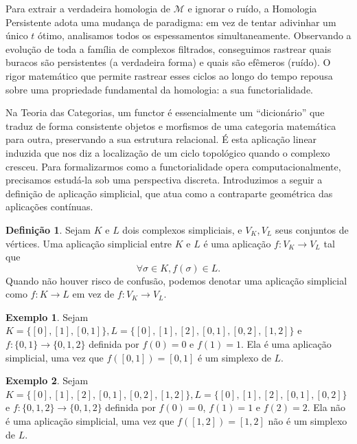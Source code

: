 \documentclass[12pt, a4paper]{article}
\theoremstyle{plain}
\theoremstyle{definition}
\newtheorem{definition}{Definição}[section]
\newtheorem{example}{Exemplo}[section]
\theoremstyle{remark}
\newcommand{\ident}{\hspace{2em}}
\begin{document}
\ident Para extrair a verdadeira homologia de $\mathcal{M}$ e ignorar o ruído, a Homologia Persistente adota uma mudança de paradigma: em vez de tentar adivinhar um único $t$ ótimo, analisamos todos os espessamentos simultaneamente. Observando a evolução de toda a família de complexos filtrados, conseguimos rastrear quais buracos são persistentes (a verdadeira forma) e quais são efêmeros (ruído). O rigor matemático que permite rastrear esses ciclos ao longo do tempo repousa sobre uma propriedade fundamental da homologia: a sua functorialidade.

\ident Na Teoria das Categorias, um functor é essencialmente um ``dicionário'' que traduz de forma consistente objetos e morfismos de uma categoria matemática para outra, preservando a sua estrutura relacional. É esta aplicação linear induzida que nos diz a localização de um ciclo topológico quando o complexo cresceu. Para formalizarmos como a functorialidade opera computacionalmente, precisamos estudá-la sob uma perspectiva discreta. Introduzimos a seguir a definição de aplicação simplicial, que atua como a contraparte geométrica das aplicações contínuas.

\begin{definition}
    Sejam $K$ e $L$ dois complexos simpliciais, e $V_K, V_L$ seus conjuntos de vértices. Uma aplicação simplicial entre $K$ e $L$ é uma aplicação $f: V_K \to V_L$ tal que
    \[
    \forall \sigma \in K, f(\sigma) \in L.
    \] 
    Quando não houver risco de confusão, podemos denotar uma aplicação simplicial como $f: K \to L$ em vez de $f: V_K \to V_L$.
\end{definition}

\begin{example}
    Sejam $K = \{[0], [1], [0, 1]\}, L = \{[0], [1], [2], [0, 1], [0, 2], [1, 2]\}$ e $f : \{0, 1\} \to\{0, 1, 2\}$ definida por $f(0) = 0$ e $f(1) = 1$. Ela é uma aplicação simplicial, uma vez que $f([0, 1]) = [0, 1]$ é um
    simplexo de $L$.
\end{example}
    
\begin{example}
    Sejam $K = \{[0], [1], [2], [0, 1], [0, 2], [1, 2]\}, L = \{[0], [1], [2], [0, 1], [0, 2]\}$ e $f : \{0, 1, 2\} \to\{0, 1, 2\}$ definida por $f(0) = 0$, $f(1) = 1$ e $f(2) = 2$. Ela não é uma aplicação simplicial, uma vez que $f([1, 2]) = [1, 2]$ não é um
    simplexo de $L$.
\end{example}
\end{document}

